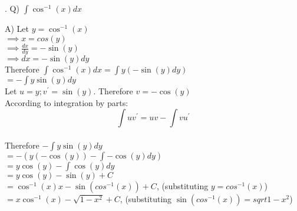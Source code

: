 \documentclass{article}
\newcounter{question}
\begin{document}
\newcommand\Que[1]{%
   \leavevmode\par
   \stepcounter{question}
   \noindent
   \thequestion. Q) #1\par}

\newcommand\Ans[2][]{%
    \leavevmode\par\noindent
   {A) \textbf{#1}#2\par}}

\Que{ $ \int{\cos^{-1}(x)}dx $ }
\Ans
{
Let $ y = \cos^{-1}(x) $\\

$\implies x = cos(y) $\\

$\implies \frac{dx}{dy} = -\sin(y) $\\

$\implies dx = -\sin(y) dy $\\

Therefore $ \int{\cos^{-1}(x)}dx
= \int{y(-\sin(y)dy)}$\\

$= -\int{y\sin(y) dy} $\\

Let $ u=y;v^{\prime}=\sin(y) $.
Therefore $ v= -\cos(y) $\\

According to integration by parts:\\
$$\int{uv^{\prime}}=uv-\int{vu^{\prime}}$$\\

Therefore $ -\int{y\sin(y) dy} $\\

$= -(y(-\cos(y)) - \int{-\cos(y) dy}) $\\

$= y\cos(y) - \int{\cos(y) dy}$\\

$= y\cos(y) - \sin(y) + C $\\

$= \cos^{-1}(x)x - \sin(cos^{-1}(x)) + C $, 
(substituting $ y=cos^{-1}(x) $)\\

$= x\cos^{-1}(x) - \sqrt{1-x^2} + C $, 
(substituting $ \sin(cos^{-1}(x))=sqrt{1-x^2} $)\\

}
\end{document}
